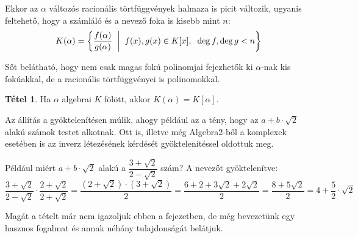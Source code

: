 \documentclass[12pt]{book}
\theoremstyle{plain} %
\theoremstyle{definition} %
\newtheorem{theo/}{Tétel}[section]
\newenvironment{theo}
  {\renewcommand{\qedsymbol}{$\clubsuit$}%
   \pushQED{\qed}\begin{theo/}}
  {\popQED\end{theo/}}
\theoremstyle{remark}
\renewcommand\qedsymbol{$\blacksquare$}
\numberwithin{equation}{section}  %
\begin{document}
	Ekkor az $\alpha$ változós racionális törtfüggvények halmaza is picit változik, ugyanis feltehető, hogy a számláló és a nevező foka is kisebb mint $n$:
	\[ K(\alpha) = \left \{ \dfrac{f(\alpha)}{g(\alpha)} \hspace{2mm} \middle | \hspace{2mm} f(x),g(x)\in K[x], \hspace{2mm} \deg f,\deg g < n \right \} \]

	Sőt belátható, hogy nem csak magas fokú polinomjai fejezhetők ki $\alpha$-nak kis fokúakkal, de a racionális törtfüggvényei is polinomokkal.
	
	\begin{theo}\label{egyszerubovitesleirasa}
		Ha $\alpha$ algebrai $K$ fölött, akkor $K(\alpha)=K[\alpha]$.
	\end{theo}
	
	Az állítás a gyöktelenítésen múlik, ahogy például az a tény, hogy az $a+b\cdot \sqrt{2}$ alakú számok testet alkotnak. Ott is, illetve még Algebra2-ből a komplexek esetében is az inverz létezésének kérdését gyöktelenítéssel oldottuk meg.
	
	Például miért $a+b\cdot \sqrt{2}$ alakú a $\dfrac{3+\sqrt{2}}{2-\sqrt{2}}$ szám? A nevezőt gyöktelenítve:
	\[ \dfrac{3+\sqrt{2}}{2-\sqrt{2}} \cdot \dfrac{2+\sqrt{2}}{2+\sqrt{2}} = \dfrac{(2+\sqrt{2})\cdot (3+\sqrt{2})}{2} = \dfrac{6+2+3\sqrt{2}+2\sqrt{2}}{2} = \dfrac{8+5\sqrt{2}}{2} = 4 + \dfrac{5}{2} \cdot \sqrt{2} \]
	
	Magát a tételt már nem igazoljuk ebben a fejezetben, de még bevezetünk egy hasznos fogalmat és annak néhány tulajdonságát belátjuk.
	
\end{document}
